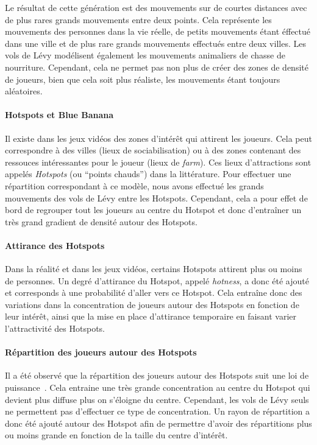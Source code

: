 Le résultat de cette génération est des mouvements sur de courtes distances avec de plus rares grands mouvements entre deux points.
Cela représente les mouvements des personnes dans la vie réelle, de petits mouvements étant éffectué dans une ville et de plus rare grands mouvements effectués entre deux villes.
Les vols de Lévy modélisent également les mouvements animaliers de chasse de nourriture.
Cependant, cela ne permet pas non plus de créer des zones de densité de joueurs, bien que cela soit plus réaliste, les mouvements étant toujours aléatoires.

\paragraph{Hotspots et Blue Banana\\}
Il existe dans les jeux vidéos des zones d'intérêt qui attirent les joueurs.
Cela peut correspondre à des villes (lieux de sociabilisation) ou à des zones contenant des ressouces intéressantes pour le joueur (lieux de \textit{farm}).
Ces lieux d'attractions sont appelés \textit{Hotspots} (ou ``points chauds'') dans la littérature.
Pour effectuer une répartition correspondant à ce modèle, nous avons effectué les grands mouvements des vols de Lévy entre les Hotspots.
Cependant, cela a pour effet de bord de regrouper tout les joueurs au centre du Hotspot et donc d'entraîner un très grand gradient de densité autour des Hotspots.

\paragraph{Attirance des Hotspots\\}
Dans la réalité et dans les jeux vidéos, certains Hotspots attirent plus ou moins de personnes.
Un degré d'attirance du Hotspot, appelé \textit{hotness}, a donc été ajouté et corresponds à une probabilité d'aller vers ce Hotspot.
Cela entraîne donc des variations dans la concentration de joueurs autour des Hotspots en fonction de leur intérêt, ainsi que la mise en place d'attirance temporaire en faisant varier l'attractivité des Hotspots.

\paragraph{Répartition des joueurs autour des Hotspots\\}
Il a été observé que la répartition des joueurs autour des Hotspots suit une loi de puissance~\cite{these_raluca}.
Cela entraine une très grande concentration au centre du Hotspot qui devient plus diffuse plus on s'éloigne du centre.
Cependant, les vols de Lévy seuls ne permettent pas d'effectuer ce type de concentration.
Un rayon de répartition a donc été ajouté autour des Hotspot afin de permettre d'avoir des répartitions plus ou moins grande en fonction de la taille du centre d'intérêt.

